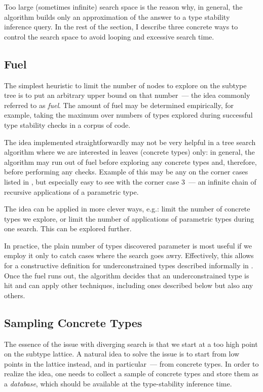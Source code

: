 Too large (sometimes infinite) search space is the reason why, in general, the
algorithm builds only an approximation of the answer to a type stability
inference query. In the rest of the section, I describe three concrete ways to
control the search space to avoid looping and excessive search time.

\subsection{Fuel}

The simplest heuristic to limit the number of nodes to explore on the subtype tree
is to put an arbitrary upper bound on that number~--- the idea commonly referred
to as \emph{fuel}. The amount of fuel may be determined empirically, for
example, taking the maximum over numbers of types explored during successful type
stability checks in a corpus of code.

The idea implemented straightforwardly may not be very helpful in a tree search
algorithm where we are interested in leaves (concrete types) only: in general,
the algorithm may run out of fuel before exploring any concrete types and,
therefore, before performing any checks. Example of this may be any on the
corner cases listed in , but especially easy to see
with the corner case 3~--- an infinite chain of recursive applications of
a parametric type.

The idea can be applied in more clever ways, e.g.: limit the number of concrete
types we explore, or limit the number of applications of parametric types during
one search. This can be explored further.

In practice, the plain number of types discovered parameter is most useful if we employ it
only to catch cases where the search goes awry. Effectively, this allows for a
constructive definition for underconstrained types described informally in
. Once the fuel runs out, the algorithm decides
that an underconstrained type is hit and can apply other techniques, including
ones described below but also any others.

\subsection{Sampling Concrete Types}

The essence of the issue with diverging search is that we start at a too high
point on the subtype lattice. A natural idea to solve the issue is to start from
low points in the lattice instead, and in particular~--- from concrete types.
In order to realize the idea, one needs to collect a sample of concrete types
and store them as a \emph{database}, which should be available at the
type-stability inference time.

